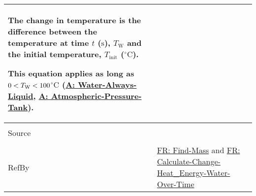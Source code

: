\documentclass[12pt]{article}
\newcommand{\lt}{\ensuremath <}
\begin{document}
\begin{minipage}{\textwidth}
\begin{tabular}{>{\raggedright}p{}>{\raggedright\arraybackslash}p{}}
        The change in temperature is the difference between the temperature at time $t$ (${\text{s}}$), ${T_{\text{W}}}$ and the initial temperature, ${T_{\text{init}}}$ (${{}^{\circ}\text{C}}$).
        
        This equation applies as long as $0\lt{}{T_{\text{W}}}\lt{}100$${{}^{\circ}\text{C}}$ (\hyperref[assumpWAL]{A: Water-Always-Liquid}, \hyperref[assumpAPT]{A: Atmospheric-Pressure-Tank}).
        
\\ \midrule \\
Source & \cite{koothoor2013}
         
\\ \midrule \\
RefBy & \hyperref[findMass]{FR: Find-Mass} and \hyperref[calcChgHeatEnergyWtrOverTime]{FR: Calculate-Change-Heat\_Energy-Water-Over-Time}
        
\\ \bottomrule
\end{tabular}
\end{minipage}
\end{document}
